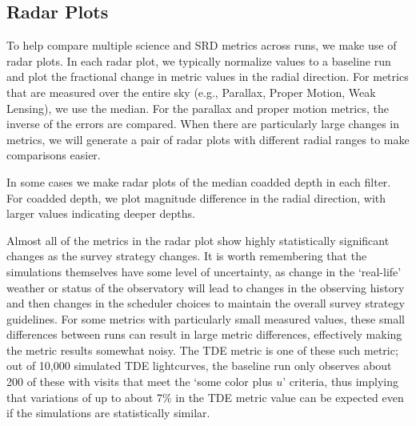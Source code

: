 \subsection{Radar Plots}

To help compare multiple science and SRD metrics across runs, we make use of radar plots. In each radar plot, we typically normalize values to a baseline run and plot the fractional change in metric values in the radial direction. For metrics that are measured over the entire sky (e.g., Parallax, Proper Motion, Weak Lensing), we use the median. For the parallax and proper motion metrics, the inverse of the errors are compared. When there are particularly large changes in metrics, we will generate a pair of radar plots with different radial ranges to make comparisons easier.

In some cases we make radar plots of the median coadded depth in each filter. For coadded depth, we plot magnitude difference in the radial direction, with larger values indicating deeper depths. 

Almost all of the metrics in the radar plot show highly statistically significant changes as the survey strategy changes. It is worth remembering that the simulations themselves have some level of uncertainty, as change in the `real-life' weather or status of the observatory will lead to changes in the observing history and then changes in the scheduler choices to maintain the overall survey strategy guidelines. For some metrics with particularly small measured values, these small differences between runs can result in large metric differences, effectively making the metric results somewhat noisy. The TDE metric is one of these such metric; out of 10,000 simulated TDE lightcurves, the baseline run only observes about 200 of these with visits that meet the `some color plus $u$' criteria, thus implying that variations of up to about 7\% in the TDE metric value can be expected even if the simulations are statistically similar.

